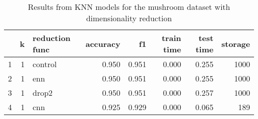 \begin{table}
\centering
\caption{Results from KNN models for the mushroom dataset with dimensionality reduction}
\label{tab:knn_reduction_results_mushroom}
\begin{tabular}{rrlrrrrr}
\toprule
 & k & reduction func & accuracy & f1 & train time & test time & storage \\
\midrule
1 & 1 & control & 0.950 & 0.951 & 0.000 & 0.255 & 1000 \\
2 & 1 & enn & 0.950 & 0.951 & 0.000 & 0.255 & 1000 \\
3 & 1 & drop2 & 0.950 & 0.951 & 0.000 & 0.257 & 1000 \\
4 & 1 & cnn & 0.925 & 0.929 & 0.000 & 0.065 & 189 \\
\bottomrule
\end{tabular}
\end{table}

